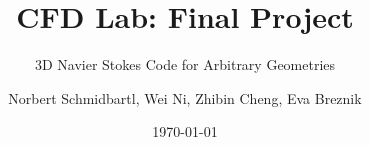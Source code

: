 \documentclass{beamer}
\title{CFD Lab: Final Project}
\subtitle{3D Navier Stokes Code for Arbitrary Geometries}    %
\author{Norbert Schmidbartl, Wei Ni, Zhibin Cheng, Eva Breznik}
\institute[TUM]{Technische Universit\"{a}t M\"{u}nchen \\ Fakult\"{a}t f\"{u}r Informatik}
\date{\today}
\begin{document}
\begin{frame}
\maketitle %
\end{frame}


\end{document}
